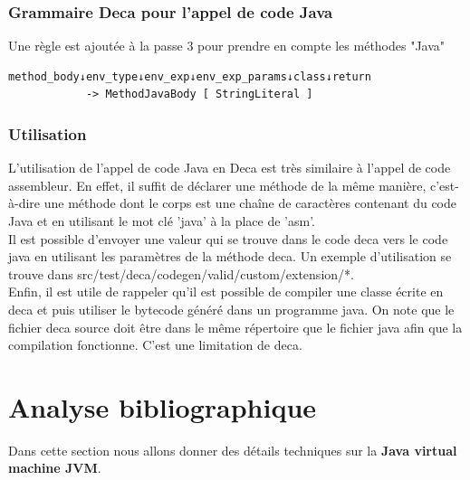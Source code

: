 \documentclass[12pt, a4paper, one side]{article}
\begin{document}
    \subsubsection{Grammaire Deca pour l'appel de code Java}
    Une règle est ajoutée à la passe 3 pour prendre en compte les méthodes "Java"
    \begin{lstlisting}
method_body↓env_type↓env_exp↓env_exp_params↓class↓return
            -> MethodJavaBody [ StringLiteral ]
    \end{lstlisting}

    \subsubsection{Utilisation}
    L'utilisation de l'appel de code Java en Deca est très similaire à l'appel de code assembleur. En effet, il suffit de déclarer une méthode de la même manière, c'est-à-dire une méthode dont le corps est une chaîne de caractères contenant du code Java et en utilisant le mot clé 'java' à la place de 'asm'.
    \\

    Il est possible d'envoyer une valeur qui se trouve dans le code deca vers le code java en utilisant les paramètres de la méthode deca. Un exemple d'utilisation se trouve dans src/test/deca/codegen/valid/custom/extension/*.
    \\

    Enfin, il est utile de rappeler qu'il est possible de compiler une classe écrite en deca et puis utiliser le bytecode généré dans un programme java. On note que le fichier deca source doit être dans le même répertoire que le fichier java afin que la compilation fonctionne. C'est une limitation de deca.

    \section{Analyse bibliographique}
    Dans cette section nous allons donner des détails techniques sur la  \textbf{Java virtual machine JVM}.
\end{document}
